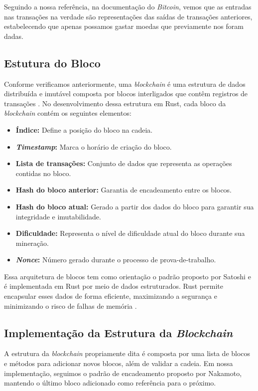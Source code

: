 \documentclass[article,12pt,oneside,a4paper,english,brazil]{unifil}
\begin{document}
\begin{Spacing}{1.5}
Seguindo a nossa referência, na documentação do \textit{Bitcoin}, vemos que as entradas nas transações na verdade são representações das saídas de transações anteriores, estabelecendo que apenas possamos gastar moedas que previamente nos foram dadas.

\subsection*{Estutura do Bloco}

Conforme verificamos anteriormente, uma \textit{blockchain} é uma estrutura de dados distribuída e imutável composta por blocos interligados que contêm registros de transações \cite{nakamoto2008bitcoin}. No desenvolvimento dessa estrutura em Rust, cada bloco da \textit{blockchain} contém os seguintes elementos:

\begin{itemize}
    \item \textbf{Índice:} Define a posição do bloco na cadeia.
    \item \textbf{\textit{Timestamp}:} Marca o horário de criação do bloco.
    \item \textbf{Lista de transações:} Conjunto de dados que representa as operações contidas no bloco.
    \item \textbf{Hash do bloco anterior:} Garantia de encadeamento entre os blocos.
    \item \textbf{Hash do bloco atual:} Gerado a partir dos dados do bloco para garantir sua integridade e imutabilidade.
    \item \textbf{Dificuldade:} Representa o nível de dificuldade atual do bloco durante sua mineração.
    \item  \textbf{\textit{Nonce}:} Número gerado durante o processo de prova-de-trabalho.

\end{itemize}

Essa arquitetura de blocos tem como orientação o padrão proposto por Satoshi e é implementada em Rust por meio de dados estruturados. Rust permite encapsular esses dados de forma eficiente, maximizando a segurança e minimizando o risco de falhas de memória \cite{matsakis2014rust}.

\subsection*{Implementação da Estrutura da \textit{Blockchain}}

A estrutura da \textit{blockchain} propriamente dita é composta por uma lista de blocos e métodos para adicionar novos blocos, além de validar a cadeia. Em nossa implementação, seguimos o padrão de encadeamento proposto por Nakamoto, mantendo o último bloco adicionado como referência para o próximo.


\end{Spacing}
\end{document}
